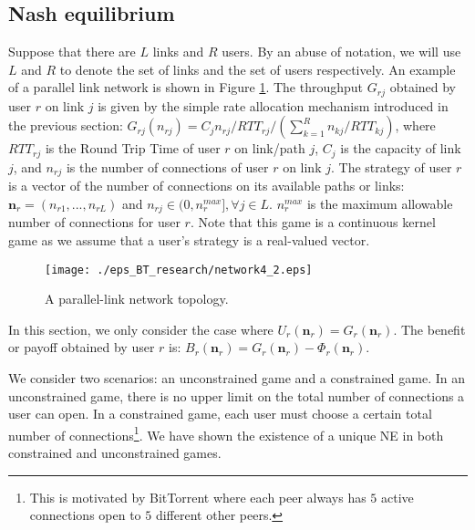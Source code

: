 \documentclass[conference]{IEEEtran}
\begin{document}

\subsection{Nash equilibrium}


Suppose that there are $L$ links and $R$ users. By an abuse of
notation, we will use $L$ and $R$ to denote the set of links and
the set of users respectively.
An example of a parallel link network is shown in Figure
\ref{fig:network4}.
The throughput $G_{rj}$ obtained by user $r$ on link $j$ is given
by the simple rate allocation mechanism introduced in the previous
section:
 $G_{rj}(n_{rj})=C_j n_{rj}/RTT_{rj}/(\sum_{k=1}^R
n_{kj}/RTT_{kj})$, where $RTT_{rj}$ is the Round Trip Time of user
$r$ on link/path $j$, $C_j$ is the capacity of link $j$, and
$n_{rj}$ is the number of connections of user $r$ on link $j$. The
strategy of user $r$ is a vector of the number of connections on
its available paths or links: $\mathbf{n}_r=(n_{r1},...,n_{rL})$
and $n_{rj}\in (0, n^{max}_r], \forall j\in L$. $n^{max}_r$ is the
maximum allowable number of connections for user $r$. Note that
this game is a continuous kernel game \cite{basar98game} as we
assume that a user's strategy is a real-valued vector.
\begin{figure}[htb!]
    \begin{center}
\texttt{[image: ./eps\_BT\_research/network4\_2.eps]}
\caption{A parallel-link network topology.} \label{fig:network4}
     \end{center}
\end{figure}

In this section, we only consider the case where
$U_r(\mathbf{n}_r)=G_r(\mathbf{n}_r)$. The benefit or payoff
obtained by user $r$ is: $B_r(\mathbf{n}_r) =
G_r(\mathbf{n}_r)-\Phi_{r}(\mathbf{n}_r)$.




We consider two scenarios: an unconstrained game and a constrained
game. In an unconstrained game, there is no upper limit on the
total number of connections a user can open. In a constrained
game, each user must choose a certain total number of
connections\footnote{This is motivated by BitTorrent \cite{bt}
where each peer always has $5$ active connections open to $5$
different other peers.}. We have shown the existence of a unique
NE in both constrained and unconstrained games.
\end{document}
